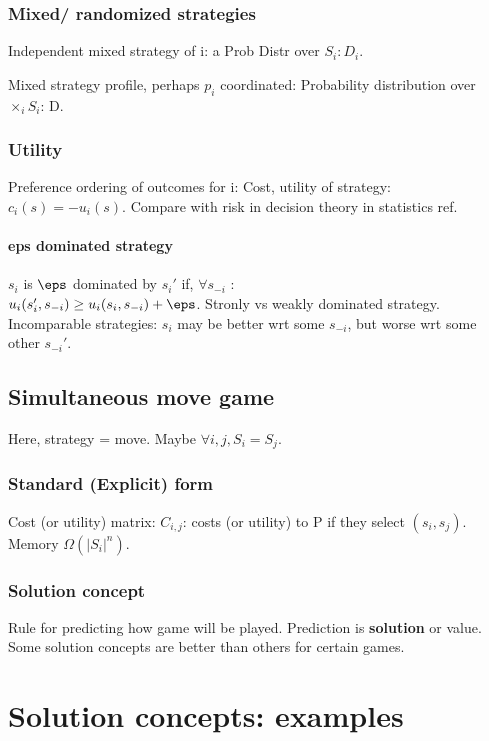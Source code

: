\documentclass[oneside, article]{memoir}
\begin{document}
\subsection{Mixed/ randomized strategies}
Independent mixed strategy of i: a Prob Distr over $S_{i}: D_{i}$.

Mixed strategy profile, perhaps $p_{i}$ coordinated: Probability distribution over $\times_{i}S_{i}$: D.

\subsection{Utility}
Preference ordering of outcomes for i: Cost, utility of strategy:\\
 $c_{i}(s) = -u_{i}(s)$. Compare with risk in decision theory in statistics ref.

\subsubsection{eps dominated strategy}
$s_{i}$ is $\eps$ dominated by $s_{i}'$ if, $\forall s_{-i}$ :\\
$u_{i}(s'_{i}, s_{-i}) \geq u_{i}(s_{i}, s_{-i}) + \eps$. Stronly vs weakly dominated strategy. Incomparable strategies: $s_{i}$ may be better wrt some $s_{-i}$, but worse wrt some other $s_{-i}'$.

\section{Simultaneous move game}
Here, strategy = move. Maybe $\forall i, j, S_{i} = S_{j}$.

\subsection{Standard (Explicit) form}
Cost (or utility) matrix: $C_{i,j}$: costs (or utility) to P if they select $(s_{i}, s_{j})$. Memory $\Omega(|S_{i}|^{n})$.

\subsection{Solution concept}
Rule for predicting how game will be played. Prediction is \textbf{solution} or value. Some solution concepts are better than others for certain games.

\chapter{Solution concepts: examples}
\end{document}
